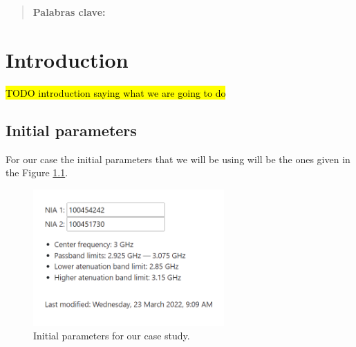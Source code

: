 \documentclass[12pt]{report} %
\newcommand{\todo}[1]{\sethlcolor{green}\hl{TODO #1}}
\let\oldsection\section
\renewcommand\section{\clearpage\oldsection}
\begin{document}
\newpage %
\thispagestyle{empty}
\mbox{}

\renewcommand\abstractname{\large\bfseries\filcenter\uppercase{Resumen}}
\begin{abstract}
\thispagestyle{plain}
\setcounter{page}{3}
	
	
	\textbf{Palabras clave:}
	
	\vfill
\end{abstract}
	\newpage %
	\thispagestyle{empty}
	\mbox{}



\tableofcontents
\thispagestyle{fancy}

\newpage %
\thispagestyle{empty}


\clearpage
{} %

\chapter{Introduction}

\todo{introduction saying what we are going to do}

\section{Initial parameters}

For our case the initial parameters that we will be using will be the ones given in the Figure \ref{fig:introduction:initial_parameters}.

\begin{figure}[htbp]
    \centering
    \includegraphics[width=0.65\textwidth]{introduction/initial_parameters_calculator.png}
    \caption{Initial parameters for our case study.}
    \label{fig:introduction:initial_parameters}
\end{figure}
\end{document}
